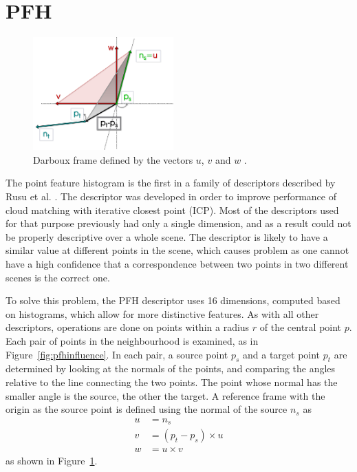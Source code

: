 \documentclass[11pt,a4paper]{kth-mag}
\begin{document}
\section{PFH}
\begin{figure}
  \centering
  \includegraphics[width=0.48\textwidth]{images/darboux}
  \caption{Darboux frame defined by the vectors $u$, $v$ and $w$ \cite{rusu2008learning}.}
  \label{fig:darboux}
\end{figure}
The point feature histogram is the first in a family of descriptors described by
Rusu et al. \cite{rusu2008aligning}. The descriptor was developed in order to
improve performance of cloud matching with iterative closest point (ICP). Most
of the descriptors used for that purpose previously had only a single dimension,
and as a result could not be properly descriptive over a whole scene. The
descriptor is likely to have a similar value at different points in the scene,
which causes problem as one cannot have a high confidence that a correspondence
between two points in two different scenes is the correct one.

To solve this problem, the PFH descriptor uses 16 dimensions, computed based on
histograms, which allow for more distinctive features. As with all other
descriptors, operations are done on points within a radius $r$ of the central
point $p$. Each pair of points in the neighbourhood is examined, as in
Figure~\ref{fig:pfhinfluence}. In each pair, a source point $p_s$ and a target
point $p_t$ are determined by looking at the normals of the points, and
comparing the angles relative to the line connecting the two points. The point
whose normal has the smaller angle is the source, the other the target. A
reference frame with the origin as the source point is defined using the normal
of the source $n_s$ as
\begin{align}
  \label{eq:19}
  u&=n_s\\
  v&=(p_t-p_s)\times u\\
  w&=u\times v
\end{align}
as shown in Figure~\ref{fig:darboux}.
\end{document}

